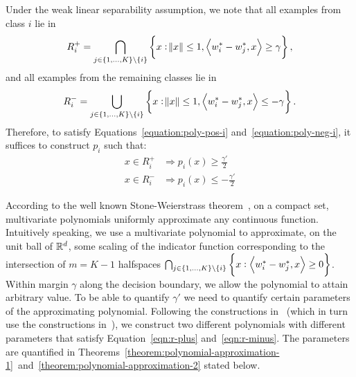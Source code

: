 Under the weak linear separability assumption, we note that all examples from
class $i$ lie in
\[ R_i^+ = \bigcap_{j \in \cbr{1,\ldots,K} \setminus \cbr{i}} \cbr{x: \norm{x} \le 1, \ip{w_i^* - w_j^*}{x} \geq \gamma}, \] and all examples from the remaining classes lie in
\[ R_i^- = \bigcup_{j \in \cbr{1,\ldots,K} \setminus \cbr{i}} \cbr{x: \norm{x} \le 1, \ip{w_i^* - w_j^*}{x} \leq  -\gamma}. \]
Therefore, to satisfy Equations~\eqref{equation:poly-pos-i}
and~\eqref{equation:poly-neg-i}, it suffices to construct $p_i$ such that:
\begin{align}
x \in R_i^+ & \Rightarrow p_i(x) \ge \frac {\gamma'} 2
\label{eqn:r-plus}
\\
x \in R_i^- & \Rightarrow p_i(x) \le - \frac {\gamma'} 2
\label{eqn:r-minus}
\end{align}

According to the well known Stone-Weierstrass theorem~\citep[see
e.g.][Section~10.10]{Davidson-Donsig-2010}, on a compact set,
multivariate polynomials uniformly approximate any continuous function.
Intuitively speaking, we use a multivariate polynomial to approximate, on the
unit ball of $\mathbb{R}^d$, some scaling of the indicator function corresponding to the intersection of
$m=K-1$ halfspaces $\bigcap_{j \in \cbr{1,\ldots,K} \setminus \cbr{i}} \cbr{x: \ip{w_i^* - w_j^*}{x} \geq 0}$. Within margin $\gamma$ along the decision boundary, we allow
the polynomial to attain arbitrary value. To be able to quantify $\gamma'$
we need to quantify certain parameters of the approximating polynomial.
Following the constructions in~\citet{Klivans-Servedio-2008}
(which in turn use the constructions in~\citet{Beigel-Reingold-Spielman-1995}), we
construct two different polynomials with different parameters that satisfy
Equation~\eqref{eqn:r-plus} and~\eqref{eqn:r-minus}.
The parameters
are quantified in
Theorems~\ref{theorem:polynomial-approximation-1}~and~\ref{theorem:polynomial-approximation-2}
stated below.

%


